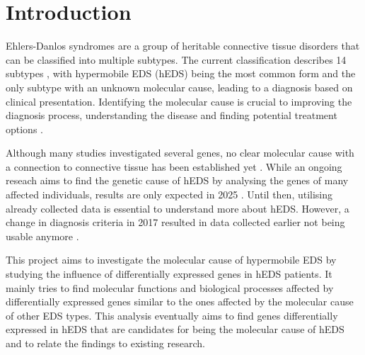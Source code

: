 \section{Introduction}


Ehlers-Danlos syndromes are a group of heritable connective tissue disorders that can be classified into multiple subtypes. The current classification describes 14 subtypes \cite{classification2017, Malfait2020}, with hypermobile EDS (hEDS) being the most common form and the only subtype with an unknown molecular cause, leading to a diagnosis based on clinical presentation. Identifying the molecular cause is crucial to improving the diagnosis process, understanding the disease and finding potential treatment options \cite{Ritelli2020}.

Although many studies investigated several genes, no clear molecular cause with a connection to connective tissue has been established yet \cite{Caliogna2021}. While an ongoing reseach aims to find the genetic cause of hEDS by analysing the genes of many affected individuals, results are only expected in 2025 \cite{HEDGE}. Until then, utilising already collected data is essential to understand more about hEDS. However, a change in diagnosis criteria in 2017 resulted in data collected earlier not being usable anymore \cite{Gensemer2021, Ritelli2022}.
%
%

This project aims to investigate the molecular cause of hypermobile EDS by studying the influence of differentially expressed genes in hEDS patients. It mainly tries to find molecular functions and biological processes affected by differentially expressed genes similar to the ones affected by the molecular cause of other EDS types. This analysis eventually aims to find genes differentially expressed in hEDS that are candidates for being the molecular cause of hEDS and to relate the findings to existing research.